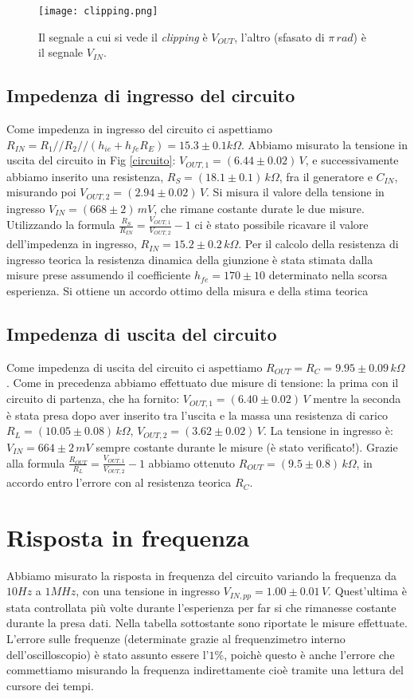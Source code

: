 \documentclass[10pt,a4paper]{article}
\begin{document}
\begin{figure}[!htb]
  \centering
  \texttt{[image: clipping.png]}
\caption{Il segnale a cui si vede il \emph{clipping} è $V_{OUT}$, l'altro (sfasato di $\pi \, rad$) è il segnale $V_{IN}$.}
\label{clipping}
\end{figure}

\subsection{Impedenza di ingresso del circuito}
Come impedenza in ingresso del circuito ci aspettiamo $R_{IN}=R_1//R_2//(h_{ie}+h_{fe}R_E) = 15.3\pm0.1 k \Omega$.
Abbiamo misurato la tensione in uscita del circuito in Fig \ref{circuito}: $V_{OUT,1} = (6.44\pm0.02) \, V$, e successivamente abbiamo inserito una resistenza, $R_S= (18.1\pm0.1) \, k\Omega$, fra il generatore e $C_{IN}$, misurando poi $V_{OUT,2}= (2.94 \pm 0.02) \, V$. Si misura il valore della tensione in ingresso $V_{IN} = (668 \pm 2) \, mV$, che rimane costante durate le due misure. Utilizzando la formula $\frac{R_S}{R_{IN}}=\frac{V_{OUT,1}}{V_{OUT,2}}-1$ ci è stato possibile ricavare il valore dell'impedenza in ingresso, $R_{IN}= 15.2\pm0.2\, k\Omega$. 
Per il calcolo della resistenza di ingresso teorica la resistenza dinamica della giunzione è stata stimata dalla misure prese assumendo il coefficiente $h_{fe} = 170\pm10$ determinato nella scorsa esperienza. Si ottiene un accordo ottimo della misura e della stima teorica

\subsection{Impedenza di uscita del circuito}
Come impedenza di uscita del circuito ci aspettiamo $R_{OUT}= R_C = 9.95\pm0.09\, k\Omega$. Come in precedenza abbiamo effettuato due misure di tensione: la prima con il circuito di partenza, che ha fornito:  $V_{OUT,1}= (6.40\pm0.02) \, V$ mentre la seconda è stata presa dopo aver inserito tra l'uscita e la massa una resistenza di carico $R_L = (10.05 \pm 0.08) \, k\Omega$, $V_{OUT,2}= (3.62\pm0.02)\,V$. La tensione in ingresso è: $V_{IN} = 664 \pm 2 \,mV$ sempre costante durante le misure (è stato verificato!). Grazie alla formula $\frac{R_{OUT}}{R_{L}}=\frac{V_{OUT,1}}{V_{OUT,2}}-1$ abbiamo ottenuto $R_{OUT}= (9.5\pm0.8)\, k\Omega$, in accordo entro l'errore con al resistenza teorica $R_C$.


\section{Risposta in frequenza}
Abbiamo misurato la risposta in frequenza del circuito variando la frequenza da $10Hz$ a $1MHz$, con una tensione in ingresso $V_{IN,pp}= 1.00 \pm 0.01\, V$. Quest'ultima è stata controllata più volte durante l'esperienza per far si che rimanesse costante durante la presa dati. Nella tabella sottostante sono riportate le misure effettuate. L'errore sulle frequenze (determinate grazie al frequenzimetro interno dell'oscilloscopio) è stato assunto essere l'$1\%$, poichè questo è anche l'errore che commettiamo misurando la frequenza indirettamente cioè tramite una lettura del cursore dei tempi.\\
\end{document}
